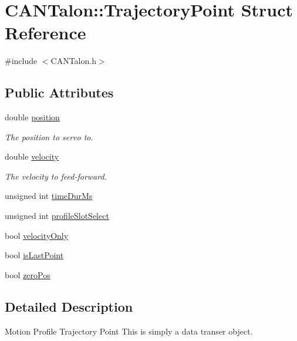 \hypertarget{struct_c_a_n_talon_1_1_trajectory_point}{}\section{C\+A\+N\+Talon\+:\+:Trajectory\+Point Struct Reference}
\label{struct_c_a_n_talon_1_1_trajectory_point}


{\ttfamily \#include $<$C\+A\+N\+Talon.\+h$>$}

\subsection*{Public Attributes}
\begin{DoxyCompactItemize}
\item 
double \hyperlink{struct_c_a_n_talon_1_1_trajectory_point_aea7407e1a0b951cd96f4768001b245c4}{position}
\begin{DoxyCompactList}\small\item\em The position to servo to. \end{DoxyCompactList}\item 
double \hyperlink{struct_c_a_n_talon_1_1_trajectory_point_a4be656118b6bd54bc33ceb55ab1aac6b}{velocity}
\begin{DoxyCompactList}\small\item\em The velocity to feed-\/forward. \end{DoxyCompactList}\item 
unsigned int \hyperlink{struct_c_a_n_talon_1_1_trajectory_point_ab42e89d7ca0228d874ff2786dd632cb1}{time\+Dur\+Ms}
\item 
unsigned int \hyperlink{struct_c_a_n_talon_1_1_trajectory_point_aa6342e0feb7ffd570dafef5f773ca250}{profile\+Slot\+Select}
\item 
bool \hyperlink{struct_c_a_n_talon_1_1_trajectory_point_a6d15bfa2f22505ffc2ec14774c2705a0}{velocity\+Only}
\item 
bool \hyperlink{struct_c_a_n_talon_1_1_trajectory_point_ab726b1367a77c689128bb4ba8e51eb8c}{is\+Last\+Point}
\item 
bool \hyperlink{struct_c_a_n_talon_1_1_trajectory_point_ad0f0243fe8d9eaa28d0eeee1026e235e}{zero\+Pos}
\end{DoxyCompactItemize}


\subsection{Detailed Description}
Motion Profile Trajectory Point This is simply a data transer object. 

